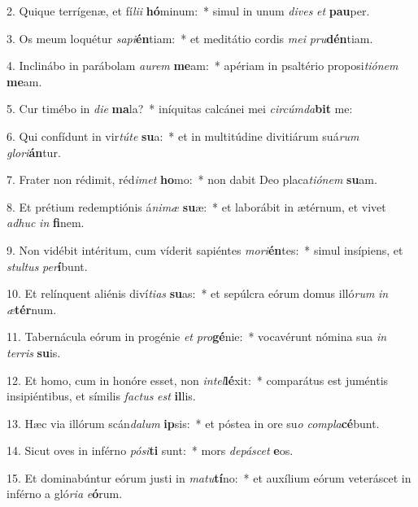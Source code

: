 2. Quique terrígenæ, et fí\textit{li}\textit{i} \textbf{hó}minum:~*  simul in unum \textit{di}\textit{ves} \textit{et} \textbf{pau}per.\

3. Os meum loquétur \textit{sa}\textit{pi}\textbf{én}tiam:~*  et meditátio cordis \textit{me}\textit{i} \textit{pru}\textbf{dén}tiam.\

4. Inclinábo in parábolam \textit{au}\textit{rem} \textbf{me}am:~*  apériam in psaltério proposi\textit{ti}\textit{ó}\textit{nem} \textbf{me}am.\

5. Cur timébo in \textit{di}\textit{e} \textbf{ma}la?~*  iníquitas calcánei mei \textit{cir}\textit{cúm}\textit{da}\textbf{bit} me:\

6. Qui confídunt in vir\textit{tú}\textit{te} \textbf{su}a:~*  et in multitúdine divitiárum suá\textit{rum} \textit{glo}\textit{ri}\textbf{án}tur.\

7. Frater non rédimit, réd\textit{i}\textit{met} \textbf{ho}mo:~*  non dabit Deo placa\textit{ti}\textit{ó}\textit{nem} \textbf{su}am.\

8. Et prétium redemptiónis á\textit{ni}\textit{mæ} \textbf{su}æ:~*  et laborábit in ætérnum, et vivet \textit{ad}\textit{huc} \textit{in} \textbf{fi}nem.\

9. Non vidébit intéritum, cum víderit sapiéntes \textit{mo}\textit{ri}\textbf{én}tes:~*  simul insípiens, et \textit{stul}\textit{tus} \textit{per}\textbf{í}bunt.\

10. Et relínquent aliénis diví\textit{ti}\textit{as} \textbf{su}as:~*  et sepúlcra eórum domus illó\textit{rum} \textit{in} \textit{æ}\textbf{tér}num.\

11. Tabernácula eórum in progénie \textit{et} \textit{pro}\textbf{gé}nie:~*  vocavérunt nómina sua \textit{in} \textit{ter}\textit{ris} \textbf{su}is.\

12. Et homo, cum in honóre esset, non \textit{in}\textit{tel}\textbf{lé}xit:~*  comparátus est juméntis insipiéntibus, et símilis \textit{fac}\textit{tus} \textit{est} \textbf{il}lis.\

13. Hæc via illórum scán\textit{da}\textit{lum} \textbf{ip}sis:~*  et póstea in ore su\textit{o} \textit{com}\textit{pla}\textbf{cé}bunt.\

14. Sicut oves in inférno \textit{pó}\textit{si}\textbf{ti} sunt:~*  mors \textit{de}\textit{pá}\textit{scet} \textbf{e}os.\

15. Et dominabúntur eórum justi in \textit{ma}\textit{tu}\textbf{tí}no:~*  et auxílium eórum veteráscet in inférno a gló\textit{ri}\textit{a} \textit{e}\textbf{ó}rum.\


